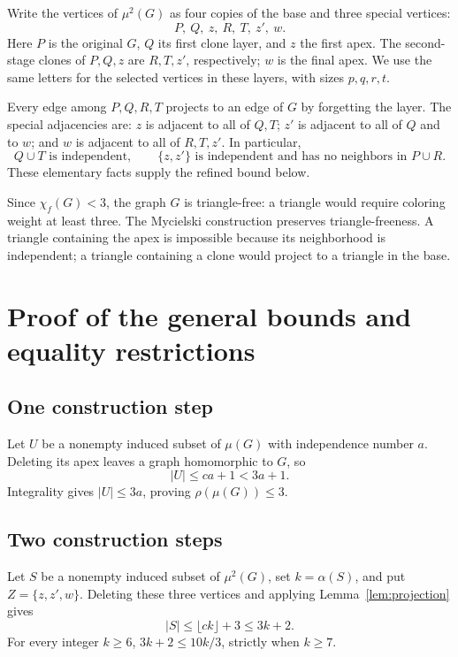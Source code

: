 \documentclass[11pt,letterpaper]{article}
\theoremstyle{remark}
\newcommand{\abs}[1]{\lvert #1\rvert}
\begin{document}
Write the vertices of $\mu^2(G)$ as four copies of the base and three
special vertices:
\[
 P,\ Q,\ z,\ R,\ T,\ z',\ w.
\]
Here $P$ is the original $G$, $Q$ its first clone layer, and $z$ the first
apex. The second-stage clones of $P,Q,z$ are $R,T,z'$, respectively;
$w$ is the final apex. We use the same letters for the selected vertices
in these layers, with sizes $p,q,r,t$.

Every edge among $P,Q,R,T$ projects to an edge of $G$ by forgetting the
layer. The special adjacencies are: $z$ is adjacent to all of $Q,T$;
$z'$ is adjacent to all of $Q$ and to $w$; and $w$ is adjacent to all of
$R,T,z'$. In particular,
\begin{equation}\label{eq:blocks}
 Q\cup T\text{ is independent},\qquad
 \{z,z'\}\text{ is independent and has no neighbors in }P\cup R.
\end{equation}
These elementary facts supply the refined bound below.

Since $\chi_f(G)<3$, the graph $G$ is triangle-free: a triangle would
require coloring weight at least three. The Mycielski construction
preserves triangle-freeness. A triangle containing the apex is impossible
because its neighborhood is independent; a triangle containing a clone
would project to a triangle in the base.

\section{Proof of the general bounds and equality restrictions}
\subsection{One construction step}
Let $U$ be a nonempty induced subset of $\mu(G)$ with independence number $a$.
Deleting its apex leaves a graph homomorphic to $G$, so
\[
 \abs U\le ca+1<3a+1.
\]
Integrality gives $\abs U\le3a$, proving $\rho(\mu(G))\le3$.

\subsection{Two construction steps}
Let $S$ be a nonempty induced subset of $\mu^2(G)$, set $k=\alpha(S)$, and put
$Z=\{z,z',w\}$. Deleting these three vertices and applying
Lemma~\ref{lem:projection} gives
\begin{equation}\label{eq:large}
 \abs S\le\lfloor ck\rfloor+3\le3k+2.
\end{equation}
For every integer $k\ge6$, $3k+2\le10k/3$, strictly when $k\ge7$.
\end{document}
